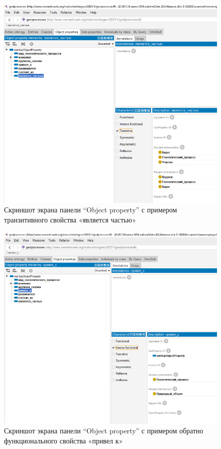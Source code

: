 \documentclass[732,14pt,final]{studrep}
\begin{document}
\begin{center}
  \begin{figure}[htp]
	\centering
	\includegraphics[width=0.9\linewidth]{pics/image11.png}
    \caption{Скриншот экрана панели “Object property” с примером транзитивного свойства «является частью»}
    \label{fig:obj-props-trans}
  \end{figure}
\end{center}

\begin{center}
  \begin{figure}[htp]
	\centering
	\includegraphics[width=0.9\linewidth]{pics/image7.png}
    \caption{Скриншот экрана панели “Object property” с примером обратно функционального свойства «привел к»}
    \label{fig:obj-prop-results}
  \end{figure}
\end{center}
\end{document}
